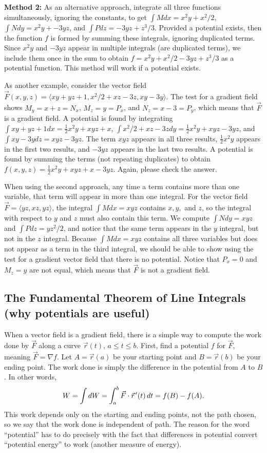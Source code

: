 \textbf{Method 2:} As an alternative approach, integrate all three
functions simultaneously, ignoring the constants, to get $\int M dx =
x^2y+x^2/2$, $\int N dy = x^2y+-3yz$, and $\int P dz = -3yz +z^3/3$.
Provided a potential exists, then the function $f$ is formed by
summing these integrals, ignoring duplicated terms. Since $x^2y$ and
$-3yz$ appear in multiple integrals (are duplicated terms), we include
them once in the sum to obtain $f= x^2y+x^2/2-3yz+z^3/3$ as a
potential function. This method will work if a potential exists.

\begin{example}
  As another example, consider the
  vector field $\vec F(x,y,z) = \langle
  xy+yz+1,x^2/2+xz-3z,xy-3y\rangle$.  The test for a gradient field
  shows $M_y=x+z=N_x$, $M_z=y=P_x$, and $N_z=x-3=P_y$, which means
  that $\vec F$ is a gradient field.  A potential is found by
  integrating $\int xy+yz+1 dx = \frac12x^2y+xyz+x$, $\int x^2/2+xz-3z
  dy =\frac12x^2y+xyz-3yz$, and $\int xy-3y dz = xyz-3yz$. The term
  $xyz$ appears in all three results, $\frac12x^2y$ appears in the
  first two results, and $-3yz$ appears in the last two results. A
  potential is found by summing the terms (not repeating duplicates)
  to obtain $f(x,y,z) = \frac 1 2 x^2y+xyz+x-3yz$.  Again, please
  check the answer.
\end{example}
When using the second approach, any time a term contains more than one
variable, that term will appear in more than one integral. For the
vector field $\vec F = \langle yz,xz,yz\rangle$, the integral $\int Mdx = xyz$
contains $x,y,$ and $z$, so the integral with respect to $y$ and $z$
must also contain this term.  We compute $\int Ndy = xyz$ and $\int Pdz =
yz^2/2$, and notice that the same term appears in the $y$ integral,
but not in the $z$ integral. Because $\int Mdx = xyz$ contains all three
variables but does not appear as a term in the third integral, we
should be able to show using the test for a gradient vector
field that there is no potential.  Notice that $P_x=0$ and $M_z=y$
are not equal, which means that $\vec F$ is not a gradient field.


\subsection{The Fundamental Theorem of Line Integrals (why potentials
are useful)}
When a vector field is a gradient field, there is a simple way to
compute the work done by $\vec F$ along a curve $\vec r(t)$, $a\leq t\leq b$.
First, find a potential $f$ for $\vec F$, meaning $\vec F =\nabla f$. Let
$A=\vec r(a)$ be your starting point and $B=\vec r(b)$ be your ending
point. The work done is simply the difference in the potential from
$A$ to $B$.  In other words, 
$$W =\int dW= \int_a^b \vec F \cdot \vec r^{\,\prime}(t) \,dt =f(B)-f(A).$$ 
This work depends only on the starting and ending points, not the path
chosen, so we say that the work done is independent of path.  The
reason for the word ``potential'' has to do precisely with the fact
that differences in potential convert ``potential energy'' to work
(another measure of energy).


